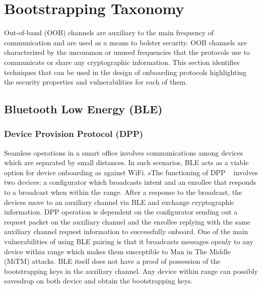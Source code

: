 \section{Bootstrapping Taxonomy}

Out-of-band (OOB) channels are auxiliary to the main frequency of communication and are used as a means to bolster security.
OOB channels are characterized by the uncommon or unused frequencies that the protocols use to communicate or share any cryptographic information.
This section identifies techniques that can be used in the design of onboarding protocols highlighting the security properties and vulnerabilities for each of them. 

\subsection{Bluetooth Low Energy (BLE)}
\subsubsection{Device Provision Protocol (DPP)}
Seamless operations in a smart office involves communications among devices which are separated by small distances.
In such scenarios, BLE acts as a viable option for device onboarding as against WiFi.
sThe functioning of DPP ~\cite{ifialliance} involves two devices: a configurator which broadcasts intent and an enrollee that responds to a broadcast when within the range.
After a response to the broadcast, the devices move to an auxiliary channel via BLE and exchange cryptographic information.
DPP operation is dependent on the configurator sending out a request packet on the auxiliary channel and the enrollee replying with the same auxiliary channel request information to successfully onboard.
One of the main vulnerabilities of using BLE pairing is that it broadcasts messages openly to any device within range which makes them susceptible to Man in The Middle (MiTM) attacks.
BLE itself does not have a proof of possession of the bootstrapping keys in the auxiliary channel.
Any device within range can possibly eavesdrop on both device and obtain the bootstrapping keys.


